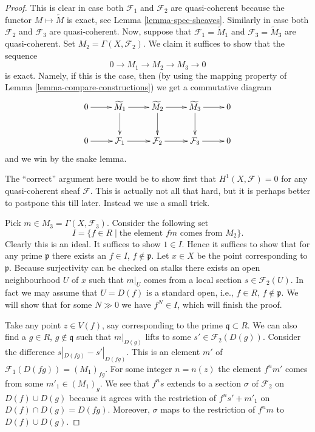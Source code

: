 \begin{proof}
This is clear in case both $\mathcal{F}_1$ and $\mathcal{F}_2$ are
quasi-coherent because the functor $M \mapsto \widetilde M$
is exact, see Lemma \ref{lemma-spec-sheaves}.
Similarly in case both $\mathcal{F}_2$ and $\mathcal{F}_3$ are
quasi-coherent. Now, suppose that $\mathcal{F}_1 = \widetilde M_1$ and
$\mathcal{F}_3 = \widetilde M_3$ are quasi-coherent.
Set $M_2 = \Gamma(X, \mathcal{F}_2)$. We claim it suffices to show that
the sequence
$$
0 \to M_1 \to M_2 \to M_3 \to 0
$$
is exact. Namely, if this is the case, then (by using the mapping
property of Lemma \ref{lemma-compare-constructions}) we get a commutative
diagram
$$
\xymatrix{
0 \ar[r] &
\widetilde M_1 \ar[r] \ar[d] &
\widetilde M_2 \ar[r] \ar[d] &
\widetilde M_3 \ar[r] \ar[d] &
0 \\
0 \ar[r] &
\mathcal{F}_1 \ar[r] &
\mathcal{F}_2 \ar[r] &
\mathcal{F}_3 \ar[r] &
0
}
$$
and we win by the snake lemma.

\medskip\noindent
The ``correct'' argument here would be to show first
that $H^1(X, \mathcal{F}) = 0$ for any quasi-coherent sheaf $\mathcal{F}$.
This is actually not all that hard, but it is perhaps better to postpone
this till later. Instead we use a small trick.

\medskip\noindent
Pick $m \in M_3 = \Gamma(X, \mathcal{F}_3)$.
Consider the following set
$$
I = \{ f \in R \mid \text{the element }fm\text{ comes from }M_2\}.
$$
Clearly this is an ideal. It suffices to show $1 \in I$.
Hence it suffices to show that for any prime $\mathfrak p$
there exists an $f \in I$, $f \not\in \mathfrak p$.
Let $x \in X$ be the point corresponding to $\mathfrak p$.
Because surjectivity can be checked on stalks
there exists an open neighbourhood $U$ of $x$ such that
$m|_U$ comes from a local section $s \in \mathcal{F}_2(U)$.
In fact we may assume that $U = D(f)$ is a standard open,
i.e., $f \in R$, $f \not \in \mathfrak p$. We will show
that for some $N \gg 0$ we have $f^N \in I$, which
will finish the proof.

\medskip\noindent
Take any point $z \in V(f)$, say corresponding to the
prime $\mathfrak q \subset R$. We can also find a $g \in R$,
$g \not \in \mathfrak q$ such that $m|_{D(g)}$ lifts
to some $s' \in \mathcal{F}_2(D(g))$.
Consider the difference $s|_{D(fg)} - s'|_{D(fg)}$.
This is an element $m'$ of $\mathcal{F}_1(D(fg)) = (M_1)_{fg}$.
For some integer $n = n(z)$ the element $f^n m'$ comes
from some $m'_1 \in (M_1)_g$. We see that
$f^n s$ extends to a section $\sigma$ of $\mathcal{F}_2$ on $D(f) \cup D(g)$
because it agrees with the restriction of
$f^n s' + m'_1$ on $D(f) \cap D(g) = D(fg)$.
Moreover, $\sigma$ maps to the restriction of $f^n m$
to $D(f) \cup D(g)$.


\end{proof}
